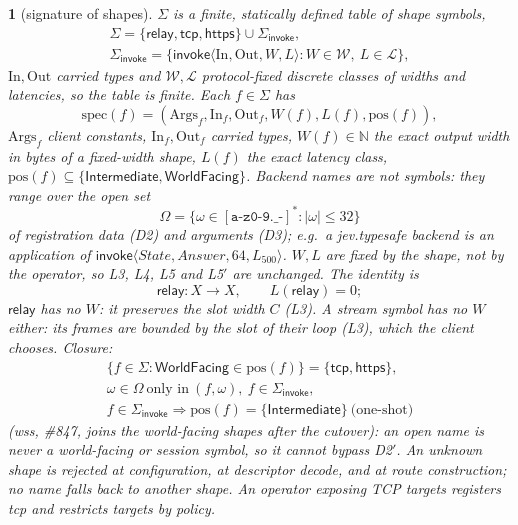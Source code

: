 \documentclass[journal]{IEEEtran}
\newcommand{\namedhead}{}
\newtheorem*{namedenv}{\namedhead}
\newenvironment{defD}[2]{\renewcommand{\namedhead}{Definition #1}%
  \begin{namedenv}[#2]}{\end{namedenv}}
\newcommand{\relay}{\mathsf{relay}}
\newcommand{\Int}{\mathsf{Intermediate}}
\newcommand{\WF}{\mathsf{WorldFacing}}
\newcommand{\spec}{\mathrm{spec}}
\newcommand{\pos}{\mathrm{pos}}
\newcommand{\Args}{\mathrm{Args}}
\newcommand{\In}{\mathrm{In}}
\newcommand{\Out}{\mathrm{Out}}
\DeclareRobustCommand{\code}[1]{{\ttfamily\renewcommand{\_}{\textunderscore\allowbreak}#1}}
\begin{document}
\begin{defD}{D1$'$}{signature of shapes}
$\Sigma$ is a finite, statically defined table of \emph{shape} symbols,
\begin{gather*}
\Sigma=\{\relay,\mathsf{tcp},\mathsf{https}\}\cup\Sigma_{\mathsf{invoke}},\\
\Sigma_{\mathsf{invoke}}=\{\mathsf{invoke}\langle\In,\Out,W,L\rangle :
W\in\mathcal W,\ L\in\mathcal L\},
\end{gather*}
$\In,\Out$ carried types and $\mathcal W,\mathcal L$ protocol-fixed
discrete classes of widths and latencies, so the table is finite.  Each $f\in\Sigma$ has
\[
\spec(f)=(\Args_f,\In_f,\Out_f,W(f),L(f),\pos(f)),
\]
$\Args_f$ client constants, $\In_f,\Out_f$ carried types, $W(f)\in\mathbb{N}$
the exact output width in bytes of a fixed-width shape, $L(f)$ the exact
latency class, $\pos(f)\subseteq\{\Int,\WF\}$.  Backend names are
\emph{not} symbols: they range over the open set
\[
\Omega=\{\omega\in[\mathtt{a\text{-}z0\text{-}9.\_\text{-}}]^{*} :
|\omega|\le32\}
\]
of registration data (D2) and arguments (D3); e.g.\ a \code{jev.typesafe}
backend is an application of $\mathsf{invoke}\langle\mathit{State},
\mathit{Answer},64,L_{500}\rangle$.  $W,L$ are fixed by the shape, not by
the operator, so L3, L4, L5 and L5$'$ are unchanged.  The identity is
\[
\relay:X\to X,\qquad L(\relay)=0 ;
\]
$\relay$ has no $W$: it preserves the slot width $C$ (L3).  A stream
symbol has no $W$ either: its frames are bounded by the slot of their
loop (L3), which the client chooses.  Closure:
\begin{gather*}
\{f\in\Sigma:\WF\in\pos(f)\}=\{\mathsf{tcp},\mathsf{https}\},\\
\omega\in\Omega\ \text{only in}\ (f,\omega),\ f\in\Sigma_{\mathsf{invoke}},\\
f\in\Sigma_{\mathsf{invoke}}\Rightarrow\pos(f)=\{\Int\}\ \text{(one-shot)}
\end{gather*}
(\code{wss}, \#847, joins the world-facing shapes after the cutover): an
open name is never a world-facing or session symbol, so it cannot bypass
D2$'$.  An unknown shape is rejected at configuration, at descriptor
decode, and at route construction; no name falls back to another shape.
An operator exposing TCP targets registers \code{tcp} and restricts
targets by policy.
\end{defD}
\end{document}
